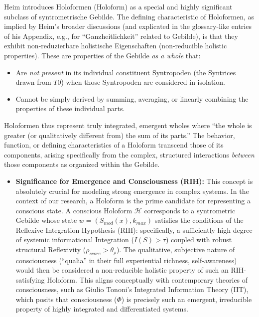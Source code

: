 \documentclass[
    12pt,              %
    a4paper,           %
    headings=normal,   %
    twoside=true,      %
    BCOR=8mm,          %
]{scrbook}
\newcommand{\q}[1]{\enquote{#1}}
\newcommand{\syntrixtotalitaet}{T0}
\newcommand{\holoform}{\text{Holoform}}
\newcommand{\Smodx}{S_{mod}(x)}
\begin{document}
Heim introduces Holoformen (\(\holoform\)) as a special and highly significant subclass of syntrometrische Gebilde. The defining characteristic of Holoformen, as implied by Heim's broader discussions (and explicated in the glossary-like entries of his Appendix, e.g., for \q{Ganzheitlichkeit} related to Gebilde), is that they exhibit non-reduzierbare holistische Eigenschaften (non-reducible holistic properties). These are properties of the Gebilde \textit{as a whole} that:
\begin{itemize}
    \item   Are \textit{not present} in its individual constituent Syntropoden (the Syntrices drawn from \(\syntrixtotalitaet\)) when those Syntropoden are considered in isolation.
    \item   Cannot be simply derived by summing, averaging, or linearly combining the properties of these individual parts.
\end{itemize}
Holoformen thus represent truly integrated, emergent wholes where \q{the whole is greater (or qualitatively different from) the sum of its parts.} The behavior, function, or defining characteristics of a Holoform transcend those of its components, arising specifically from the complex, structured interactions \textit{between} those components as organized within the Gebilde.

\begin{itemize}
    \item   \textbf{Significance for Emergence and Consciousness (RIH):} This concept is absolutely crucial for modeling strong emergence in complex systems. In the context of our research, a Holoform is the prime candidate for representing a conscious state. A conscious Holoform \(\mathcal{H}\) corresponds to a syntrometric Gebilde whose state \(w=(\Smodx, k_{max})\) satisfies the conditions of the Reflexive Integration Hypothesis (RIH): specifically, a sufficiently high degree of systemic informational Integration (\(I(S) > \tau\)) coupled with robust structural Reflexivity (\(\rho_{score} > \theta_\rho\)). The qualitative, subjective nature of consciousness (\q{qualia} in their full experiential richness, self-awareness) would then be considered a non-reducible holistic property of such an RIH-satisfying Holoform. This aligns conceptually with contemporary theories of consciousness, such as Giulio Tononi’s Integrated Information Theory (IIT), which posits that consciousness (\(\Phi\)) is precisely such an emergent, irreducible property of highly integrated and differentiated systems.
\end{itemize}
\end{document}
